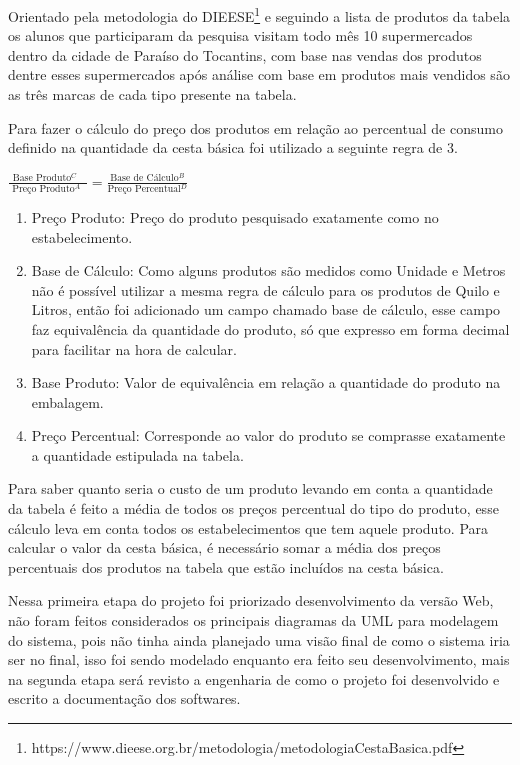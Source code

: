 \documentclass{ifto-tex}
\begin{document}
Orientado pela metodologia do DIEESE\footnote{https://www.dieese.org.br/metodologia/metodologiaCestaBasica.pdf} e seguindo a lista de produtos da tabela os alunos que participaram da pesquisa visitam todo mês 10 supermercados dentro da cidade de Paraíso do Tocantins, com base nas vendas dos produtos dentre esses supermercados após análise com base em produtos mais vendidos são as três marcas de cada tipo presente na tabela.

Para fazer o cálculo do preço dos produtos em relação ao percentual de consumo definido na quantidade da cesta básica foi utilizado a seguinte regra de 3.

\begin{center}	
$\displaystyle\frac{\mbox {Base Produto$^{C}$ }}{\mbox { Preço Produto$^{A}$ }}=\frac{\mbox {Base de Cálculo$^{B}$} }{\mbox {Preço Percentual$^{D}$}}$
\end{center}
	
	\begin{enumerate}[label=(\Alph*)]
	\item Preço Produto: Preço do produto pesquisado exatamente como no estabelecimento.
	\item Base de Cálculo: Como alguns produtos são medidos como Unidade e Metros não é possível utilizar a mesma regra de cálculo para os produtos de Quilo e Litros, então foi adicionado um campo chamado base de cálculo, esse campo faz equivalência da quantidade do produto, só que expresso em forma decimal para facilitar na hora de calcular.
	\item Base Produto: Valor de equivalência em relação a quantidade do produto na embalagem.
	\item Preço Percentual: Corresponde ao valor do produto se comprasse exatamente a quantidade estipulada na tabela.
	
\end{enumerate}

	Para saber quanto seria o custo de um produto levando em conta a quantidade da tabela é feito a média de todos os preços percentual do tipo do produto, esse cálculo leva em conta todos os estabelecimentos que tem aquele produto. Para calcular o valor da cesta básica, é necessário somar a média dos preços percentuais dos produtos na tabela que estão incluídos na cesta básica.
	
	Nessa primeira etapa do projeto foi priorizado desenvolvimento da versão Web, não foram feitos considerados os principais diagramas da UML para modelagem do sistema, pois não tinha ainda planejado uma visão final de como o sistema iria ser no final, isso foi sendo modelado enquanto era feito seu desenvolvimento, mais na segunda etapa será revisto a engenharia de como o projeto foi desenvolvido e escrito a documentação dos softwares.
	
\end{document}
